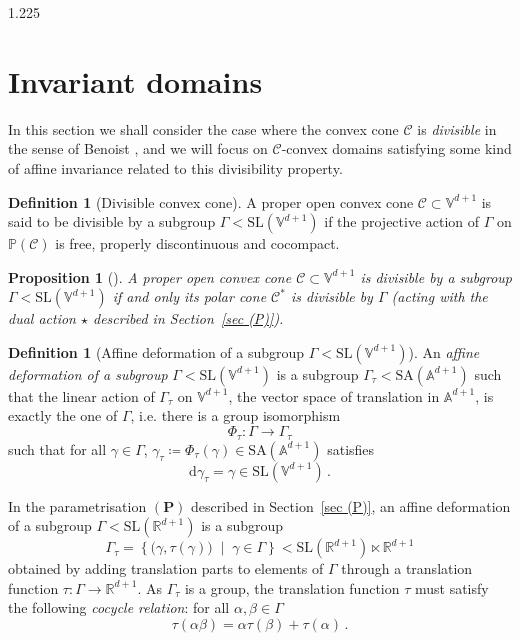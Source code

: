 \documentclass[reqno, a4paper]{amsart}
\numberwithin{equation}{section}
\numberwithin{figure}{section}
\newtheorem{proposition}[theorem]{Proposition}
\theoremstyle{definition}
\newtheorem{definition}[theorem]{Definition}
\theoremstyle{remark}
\newcommand{\R}{\mathbb{R}} %
\newcommand{\V}{\mathbb{V}} %
\newcommand{\A}{\mathbb{A}} %
\renewcommand{\P}{\mathbb{P}} %
\newcommand{\SL}{\mathrm{SL}} %
\newcommand{\SA}{\mathrm{SA}} %
\newcommand{\dif}{\mathrm{d}} %
\newcommand{\C}{\mathcal{C}} %
\newcommand{\st}{\; \middle\vert \;} %
\newcommand{\bp}[1]{{\bigl( {#1} \bigr)}} %
\begin{document}
\begin{spacing}{1.225}
\section{Invariant domains}
\label{sec invariant convex domains}

In this section we shall consider the case where the convex cone $\C$ is \emph{divisible} in the sense of Benoist \cite{Benoist_04}, and we will focus on $\C$-convex domains satisfying some kind of affine invariance related to this divisibility property.


\begin{definition}[Divisible convex cone]
A proper open convex cone $\C \subset\V^{d+1}$ is said to be divisible by a subgroup $\Gamma < \SL(\V^{d+1})$ if the projective action of $\Gamma$ on $\P(\C)$ is free, properly discontinuous and cocompact.
\end{definition}

\begin{proposition}[{\cite[Lemma~2.8]{Benoist_04}}]
A proper open convex cone $\C \subset\V^{d+1}$ is divisible by a subgroup $\Gamma < \SL(\V^{d+1})$ if and only its polar cone $\C^*$ is divisible by $\Gamma$ (acting with the dual action $\star$ described in Section~\ref{sec (P)}).
\end{proposition}

\begin{definition}[Affine deformation of a subgroup $\Gamma < \SL(\V^{d+1})$]
An \emph{affine deformation of a subgroup} $\Gamma < \SL(\V^{d+1})$ is a subgroup $\Gamma_\tau < \SA(\A^{d+1})$ such that the linear action of $\Gamma_\tau$ on $\V^{d+1}$, the vector space of translation in $\A^{d+1}$, is exactly the one of $\Gamma$, i.e. there is a group isomorphism
\begin{equation*}
 \Phi_\tau : \Gamma \longrightarrow \Gamma_\tau
\end{equation*}
such that for all $\gamma \in \Gamma$, $\gamma_\tau \coloneqq \Phi_\tau(\gamma) \in \SA(\A^{d+1})$ satisfies 
\begin{equation*}
 \dif \gamma_\tau= \gamma \in \SL(\V^{d+1})\, .
\end{equation*}
\end{definition}


In the parametrisation $(\mathbf{P})$ described in Section~\ref{sec (P)}, an affine deformation of a subgroup $\Gamma < \SL(\R^{d+1})$ is a subgroup
\begin{equation}
\label{eq affine deformation}
 \Gamma_\tau = \left\lbrace\bp{\gamma,\tau(\gamma)}\st \gamma\in \Gamma\right\rbrace < \SL (\R^{d+1}) \ltimes \R^{d+1}
\end{equation}
obtained by adding translation parts to elements of $\Gamma$ through a translation function $\tau: \Gamma \to \R^{d+1}$. As $\Gamma_\tau$ is a group, the translation function $\tau$ must satisfy the following \emph{cocycle relation}: for all $\alpha,\beta \in \Gamma$
\begin{equation*}
\label{eq cocycle condition}
\tau({\alpha \beta}) = \alpha \tau(\beta) + \tau(\alpha) \, . 
\end{equation*}


\end{spacing}
\end{document}
